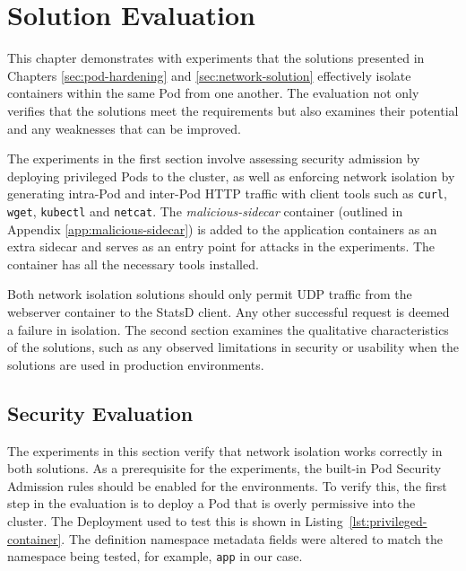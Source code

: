 \documentclass[english, 12pt, a4paper, sci, utf8, a-2b, online]{aaltothesis}
\begin{document}
\clearpage

\section{Solution Evaluation} \label{sec:solution}

This chapter demonstrates with experiments that the solutions presented in Chapters \ref{sec:pod-hardening} and \ref{sec:network-solution} effectively isolate containers within the same Pod from one another.
The evaluation not only verifies that the solutions meet the requirements but also examines their potential and any weaknesses that can be improved.

The experiments in the first section involve assessing security admission by deploying privileged Pods to the cluster, as well as enforcing network isolation by generating intra-Pod and inter-Pod HTTP traffic with client tools such as \lstinline{curl}, \lstinline{wget}, \lstinline{kubectl} and \lstinline{netcat}.
The \emph{malicious-sidecar} container (outlined in Appendix \ref{app:malicious-sidecar}) is added to the application containers as an extra sidecar and serves as an entry point for attacks in the experiments.
The container has all the necessary tools installed.



Both network isolation solutions should only permit UDP traffic from the webserver container to the StatsD client.
Any other successful request is deemed a failure in isolation.
The second section examines the qualitative characteristics of the solutions, such as any observed limitations in security or usability when the solutions are used in production environments.

\subsection{Security Evaluation}

The experiments in this section verify that network isolation works correctly in both solutions.
As a prerequisite for the experiments, the built-in Pod Security Admission rules should be enabled for the environments.
To verify this, the first step in the evaluation is to deploy a Pod that is overly permissive into the cluster.
The Deployment used to test this is shown in Listing~\ref{lst:privileged-container}.
The definition namespace metadata fields were altered to match the namespace being tested, for example, \lstinline{app} in our case.
\end{document}

